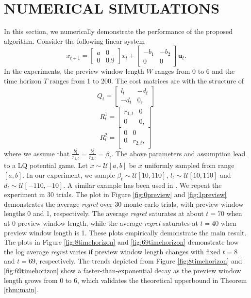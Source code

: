 \documentclass[letterpaper, 10 pt, conference]{ieeeconf}  %
\begin{document}
\section{NUMERICAL SIMULATIONS}
In this section, we numerically demonstrate the performance of the proposed algorithm. Consider the following linear system
\begin{equation}
    x_{t+1} = 
    \begin{bmatrix}
        a & 0\\
        0 & 0.9
    \end{bmatrix}
    x_{t} + 
    \begin{bmatrix}
        -b_{1} & -b_{2}\\
        0 & 0
    \end{bmatrix}\mathbf{u}_{t}.
\end{equation}
In the experiments, the preview window length $W$ ranges from 0 to 6 and the time horizon $T$ ranges from 1 to 200. The cost matrices are with the structure of
\begin{equation}
    Q_{t} = 
    \begin{bmatrix}
        l_{t} & -d_{t}\\
        -d_{t} & 0,
    \end{bmatrix}
\end{equation}
\begin{equation}
    R_{t}^{1} = 
    \begin{bmatrix}
        r_{1,t} & 0\\
        0 & 0,
    \end{bmatrix}
\end{equation}
\begin{equation}
    R_{t}^{2} = 
    \begin{bmatrix}
        0 & 0\\
        0 & r_{2,t},
    \end{bmatrix}
\end{equation}
where we assume that $\frac{b_{1}^{2}}{r_{1,t}}=\frac{b_{2}^{2}}{r_{2,t}} = \beta_{t}$. The above parameters and assumption lead to a LQ potential game. Let $x \sim \mathcal{U}[a,b]$ be $x$ uniformly sampled from range $[a,b]$. In our experiment, we sample $\beta_{t} \sim \mathcal{U}[10,110]$, $l_{t} \sim \mathcal{U}[10,110]$ and $d_{t}\sim \mathcal{U}[-110,-10]$. A similar example has been used in \cite[Section V]{prasad_structure_2023}. We repeat the experiment in 30 trials. The plot in Figure \ref{fig:0preview} and \ref{fig:1preview} demonstrates the average \emph{regret} over 30 monte-carlo trials, with preview window lengths 0 and 1, respectively. The average \emph{regret} saturates at about $t=70$ when at 0 preview window length, while the average \emph{regret} saturates at $t = 40$ when preview window length is 1. These plots empirically demonstrate the main result. The plots in Figure \ref{fig:8timehorizon} and \ref{fig:69timehorizon} demonstrate how the log average \emph{regret} varies if preview window length changes with fixed $t=8$ and $t=69$, respectively. The trends depicted from Figure \ref{fig:8timehorizon} and \ref{fig:69timehorizon} show a faster-than-exponential decay as the preview window length grows from 0 to 6, which validates the theoretical upperbound in Theorem \ref{thm:main}.
\end{document}
